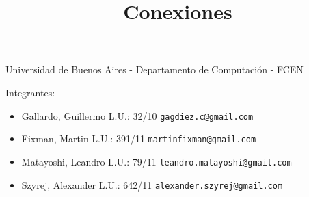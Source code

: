 \documentclass[a4paper,11pt]{article}
\title{Conexiones}
\begin{document}
\maketitle

\begin{center}
	Universidad de Buenos Aires - Departamento de Computaci\'on - FCEN
\end{center}

\vspace{2cm}
Integrantes:

\begin{itemize}
	\item Gallardo, Guillermo L.U.: 32/10 \verb+gagdiez.c@gmail.com+
	\item Fixman, Martin L.U.: 391/11 \verb+martinfixman@gmail.com+
	\item Matayoshi, Leandro L.U.: 79/11 \verb+leandro.matayoshi@gmail.com+
	\item Szyrej, Alexander L.U.: 642/11 \verb+alexander.szyrej@gmail.com+

\end{itemize}

\newpage

\tableofcontents

\newpage




\newpage

\newpage




\end{document}
